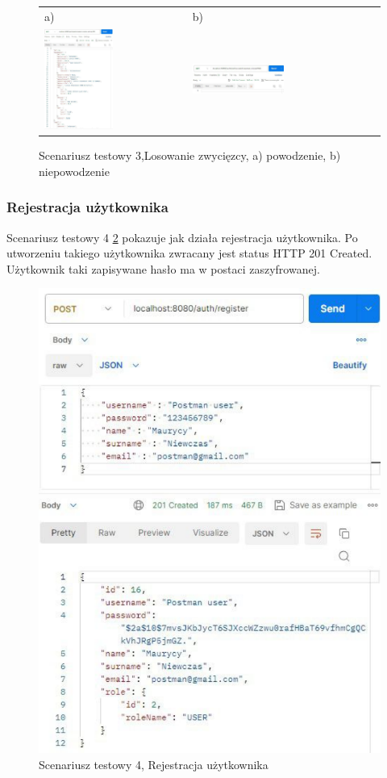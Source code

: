 \begin{figure}[htb]
  \centering
	\begin{tabular}{@{}ll@{}}
	a) & b) \\
  \includegraphics[width=0.5\textwidth]{rys06/postmanTest/winner.pdf} & 
	\includegraphics[width=0.5\textwidth]{rys06/postmanTest/badWinner.pdf}
	\end{tabular}
  \caption{Scenariusz testowy 3,Losowanie zwycięzcy, a) powodzenie, b) niepowodzenie}
  \label{winnerTest:label}
\end{figure}

\newpage
\subsubsection{Rejestracja użytkownika}
Scenariusz testowy 4 \ref{registerTest:label} pokazuje jak działa rejestracja użytkownika. Po utworzeniu takiego użytkownika zwracany jest status HTTP 201 Created. Użytkownik taki zapisywane hasło ma w postaci zaszyfrowanej.

\begin{figure}[h]
		\centering
    \includegraphics[width=0.5\linewidth]{rys06/postmanTest/register.pdf}
    \caption{Scenariusz testowy 4, Rejestracja użytkownika}
    \label{registerTest:label}
\end{figure}

